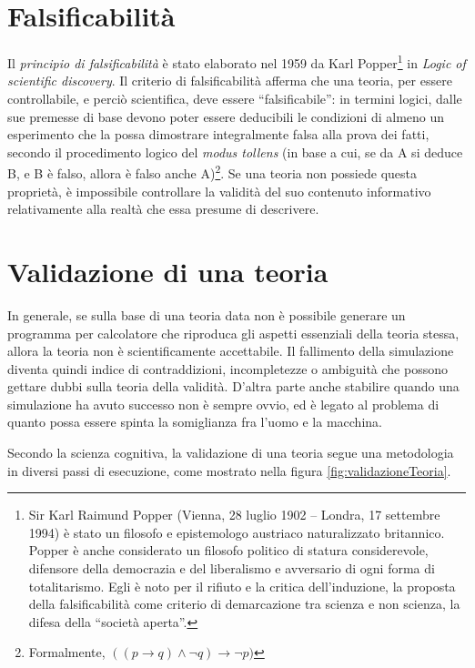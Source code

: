 \section{Falsificabilità}
Il \emph{principio di falsificabilità} è stato elaborato nel 1959 da Karl Popper\footnote{Sir Karl Raimund Popper (Vienna, 28 luglio 1902 – Londra, 17 settembre 1994) è stato un filosofo e epistemologo austriaco naturalizzato britannico. Popper è anche considerato un filosofo politico di statura considerevole, difensore della democrazia e del liberalismo e avversario di ogni forma di totalitarismo. Egli è noto per il rifiuto e la critica dell'induzione, la proposta della falsificabilità come criterio di demarcazione tra scienza e non scienza, la difesa della ``società aperta''.} in \emph{Logic of scientific discovery}. Il criterio di falsificabilità afferma che una teoria, per essere controllabile, e perciò scientifica, deve essere ``falsificabile'': in termini logici, dalle sue premesse di base devono poter essere deducibili le condizioni di almeno un esperimento che la possa dimostrare integralmente falsa alla prova dei fatti, secondo il procedimento logico del \emph{modus tollens} (in base a cui, se da A si deduce B, e B è falso, allora è falso anche A)\footnote{Formalmente, $((p \to q) \land \neg q) \to \neg p) $}. Se una teoria non possiede questa proprietà, è impossibile controllare la validità del suo contenuto informativo relativamente alla realtà che essa presume di descrivere.

\section{Validazione di una teoria}
In generale, se sulla base di una teoria data non è possibile generare un programma per calcolatore che riproduca gli aspetti essenziali della teoria stessa, allora la teoria non è scientificamente accettabile. Il fallimento della simulazione diventa quindi indice di contraddizioni, incompletezze o ambiguità che possono gettare dubbi sulla teoria della validità. D’altra parte anche stabilire quando una simulazione ha avuto successo non è sempre ovvio, ed è legato al problema di quanto possa essere spinta la somiglianza fra l’uomo e la macchina.

Secondo la scienza cognitiva, la validazione di una teoria segue una metodologia in diversi passi di esecuzione, come mostrato nella figura \ref{fig:validazioneTeoria}.

